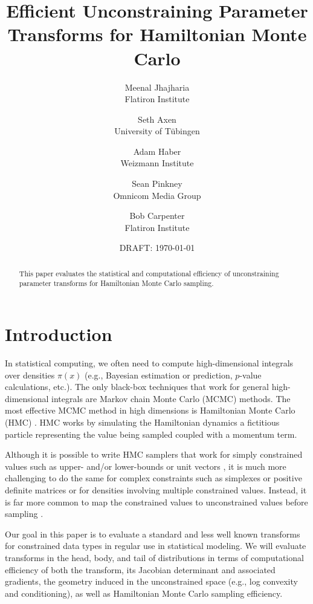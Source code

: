 \documentclass[11pt]{article}
\begin{document}
\title{Efficient Unconstraining
  Parameter Transforms for Hamiltonian Monte Carlo}
\author{Meenal Jhajharia \\ \small Flatiron Institute 
\and Seth Axen \\ \small University of T\"ubingen 
\and Adam Haber \\ \small Weizmann Institute 
\and Sean Pinkney \\ \small Omnicom Media Group
\and Bob Carpenter \\ \small Flatiron Institute}
\date{DRAFT: \today}
\maketitle

\begin{abstract}
  \noindent
  This paper evaluates the statistical and computational
  efficiency of unconstraining parameter transforms for Hamiltonian
  Monte Carlo sampling.
\end{abstract}

\section{Introduction}

In statistical computing, we often need to compute high-dimensional
integrals over densities $\pi(x)$ (e.g., Bayesian estimation or
prediction, $p$-value calculations, etc.).  The only black-box
techniques that work for general high-dimensional integrals are
Markov chain Monte Carlo (MCMC) methods.  The most effective MCMC
method in high dimensions is Hamiltonian Monte Carlo (HMC) \cite{neal2011mcmc}.
HMC works by simulating the Hamiltonian dynamics  a fictitious particle
representing the value being sampled coupled with a momentum term.

Although it is possible to write HMC samplers that work for simply
constrained values such as upper- and/or lower-bounds
\cite{neal2011mcmc} or unit vectors \cite{byrne2013geodesic}, it is
much more challenging to do the same for complex constraints such as
simplexes or positive definite matrices or for densities involving
multiple constrained values.  Instead, it is far more common to map
the constrained values to unconstrained values before sampling
\cite{JSSv076i01, radul2021base, fjelde2020bijectors}.  

Our goal in this paper is to evaluate a standard and less well known transforms for constrained data types in regular use in statistical modeling.  We will evaluate transforms in the head, body, and tail of distributions in terms of computational efficiency of both the transform, its Jacobian determinant and associated gradients, the geometry induced in the unconstrained space (e.g., log convexity and conditioning), as well as Hamiltonian Monte Carlo sampling efficiency. 
\end{document}
